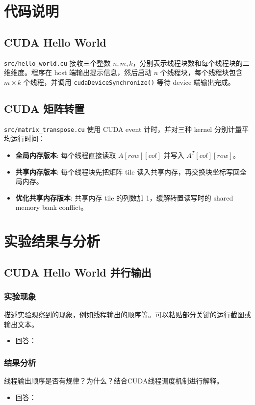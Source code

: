 \documentclass{SYSUReport}
\begin{document}
\section{代码说明}
\subsection{CUDA Hello World}
\texttt{src/hello\_world.cu} 接收三个整数 $n,m,k$，分别表示线程块数和每个线程块的二维维度。程序在 host 端输出提示信息，然后启动 $n$ 个线程块，每个线程块包含 $m\times k$ 个线程，并调用 \texttt{cudaDeviceSynchronize()} 等待 device 端输出完成。

\subsection{CUDA 矩阵转置}
\texttt{src/matrix\_transpose.cu} 使用 CUDA event 计时，并对三种 kernel 分别计量平均运行时间：
\begin{itemize}
    \item \textbf{全局内存版本}: 每个线程直接读取 $A[row][col]$ 并写入 $A^T[col][row]$。
    \item \textbf{共享内存版本}: 每个线程块先把矩阵 tile 读入共享内存，再交换块坐标写回全局内存。
    \item \textbf{优化共享内存版本}: 共享内存 tile 的列数加 1，缓解转置读写时的 shared memory bank conflict。
\end{itemize}

\section{实验结果与分析}
\subsection{CUDA Hello World 并行输出}
\subsubsection{实验现象}
描述实验观察到的现象，例如线程输出的顺序等。可以粘贴部分关键的运行截图或输出文本。
\begin{itemize}
    \item 回答：
\end{itemize}
\subsubsection{结果分析}
线程输出顺序是否有规律？为什么？结合CUDA线程调度机制进行解释。
\begin{itemize}
    \item 回答：
\end{itemize}
\end{document}
